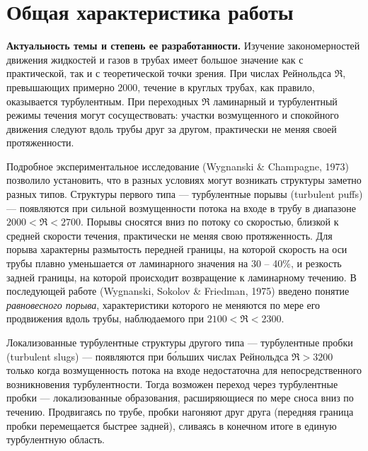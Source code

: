 \section*{\centering  Общая характеристика работы}

\textbf{Актуальность темы и степень ее разработанности.}
Изучение закономерностей движения жидкостей и газов в трубах имеет большое значение как с практической, так и с теоретической точки зрения. При числах Рейнольдса $\Re$, превышающих примерно $2000$, течение в круглых трубах, как правило, оказывается турбулентным. При переходных $\Re$ ламинарный и турбулентный режимы течения могут сосуществовать: участки возмущенного и спокойного движения следуют вдоль трубы друг за другом, практически не меняя своей протяженности. 

Подробное экспериментальное исследование (Wygnanski \& Champagne, 1973) позволило установить, что в разных условиях могут возникать структуры заметно разных типов. Структуры первого типа --- турбулентные порывы (turbulent puffs) --- появляются при сильной возмущенности потока на входе в трубу в диапазоне $2000<\Re<2700$. Порывы сносятся вниз по потоку со скоростью, близкой к средней скорости течения, практически не меняя свою протяженность. Для порыва характерны размытость передней границы, на которой скорость на оси трубы плавно уменьшается от ламинарного значения на 30 -- 40\%, и резкость задней границы, на которой происходит возвращение к ламинарному течению. В последующей работе (Wygnanski, Sokolov \& Friedman, 1975) введено понятие {\it равновесного порыва}, характеристики которого не меняются по мере его продвижения вдоль трубы, наблюдаемого при $2100 < \Re < 2300$.

Локализованные турбулентные структуры другого типа --- турбулентные пробки (turbulent slugs) --- появляются при б\'{о}льших числах Рейнольдса $\Re>3200$ только когда возмущенность потока на входе недостаточна для непосредственного возникновения турбулентности. Тогда возможен переход через турбулентные пробки --- локализованные образования, расширяющиеся по мере сноса вниз по течению. Продвигаясь по трубе, пробки нагоняют друг друга (передняя граница пробки перемещается быстрее задней), сливаясь в конечном итоге в единую турбулентную область.


